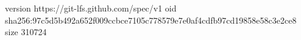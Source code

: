 version https://git-lfs.github.com/spec/v1
oid sha256:97c5d5b492a652f009ccbce7105c778579e7e0af4cdfb97cd19858e58c3e2ce8
size 310724
